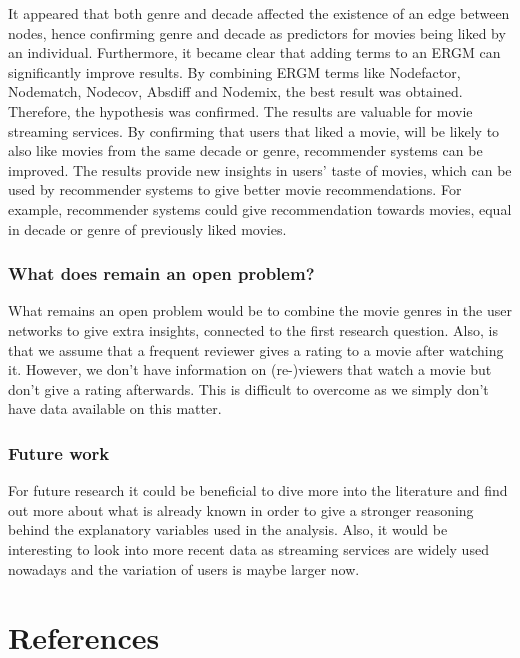 \documentclass[
  english,
  man,floatsintext]{apa6}
\begin{document}
It appeared that both genre and decade affected the existence of an edge between nodes, hence confirming genre and decade as predictors for movies being liked by an individual. Furthermore, it became clear that adding terms to an ERGM can significantly improve results. By combining ERGM terms like Nodefactor, Nodematch, Nodecov, Absdiff and Nodemix, the best result was obtained. Therefore, the hypothesis was confirmed.
The results are valuable for movie streaming services. By confirming that users that liked a movie, will be likely to also like movies from the same decade or genre, recommender systems can be improved. The results provide new insights in users' taste of movies, which can be used by recommender systems to give better movie recommendations. For example, recommender systems could give recommendation towards movies, equal in decade or genre of previously liked movies.

\hypertarget{what-does-remain-an-open-problem}{%
\subsubsection{What does remain an open problem?}\label{what-does-remain-an-open-problem}}

What remains an open problem would be to combine the movie genres in the user networks to give extra insights, connected to the first research question. Also, is that we assume that a frequent reviewer gives a rating to a movie after watching it. However, we don't have information on (re-)viewers that watch a movie but don't give a rating afterwards. This is difficult to overcome as we simply don't have data available on this matter.

\hypertarget{future-work}{%
\subsubsection{Future work}\label{future-work}}

For future research it could be beneficial to dive more into the literature and find out more about what is already known in order to give a stronger reasoning behind the explanatory variables used in the analysis. Also, it would be interesting to look into more recent data as streaming services are widely used nowadays and the variation of users is maybe larger now.

\newpage

\hypertarget{references}{%
\section{References}\label{references}}
\end{document}
